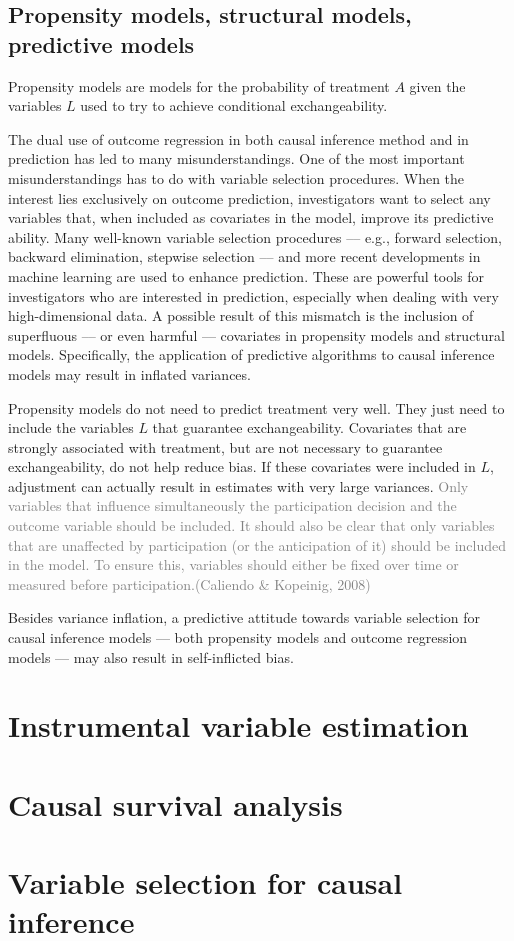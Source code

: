 \documentclass{article}
\begin{document}
\subsection{Propensity models, structural models, predictive models}
Propensity models are models for the probability of treatment $A$ given the variables $L$ used to try to achieve conditional exchangeability.

The dual use of outcome regression in both causal inference method and in prediction has led to many misunderstandings. One of the most important misunderstandings has to do with variable selection procedures. When the interest lies exclusively on outcome prediction, investigators want to select any variables that, when included as covariates in the model, improve its predictive ability. Many well-known variable selection procedures –– e.g., forward selection, backward elimination, stepwise selection –– and more recent developments in machine learning are used to enhance prediction. These are powerful tools for investigators who are interested in prediction, especially when dealing with very high-dimensional data.  A possible result of this mismatch is the inclusion of superfluous –– or even harmful –– covariates in propensity models and structural models. Specifically, the application of predictive algorithms to causal inference models may result in inflated variances.

Propensity models do not need to predict treatment very well. They just need to include the variables $L$ that guarantee exchangeability. Covariates that are strongly associated with treatment, but are not necessary to guarantee exchangeability, do not help reduce bias. If these covariates were included in $L$, adjustment can actually result in estimates with very large variances. \textcolor{gray}{Only variables that influence simultaneously the participation decision and the outcome variable should be included. It should also be clear that only variables that are unaffected by participation (or the anticipation of it) should be included in the model. To ensure this, variables should either be fixed over time or measured before participation.(Caliendo \& Kopeinig, 2008)}

Besides variance inflation, a predictive attitude towards variable selection for causal inference models –– both propensity models and outcome regression models –– may also result in self-inflicted bias.

\section{Instrumental variable estimation}

\section{Causal survival analysis}

\section{Variable selection for causal inference}
\end{document}
